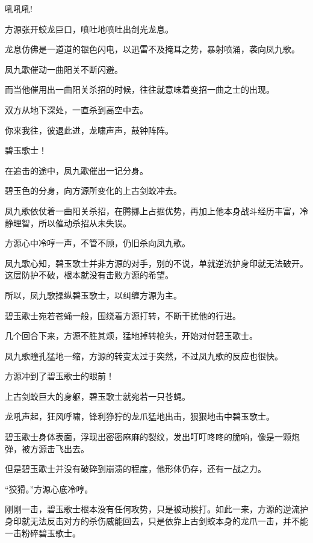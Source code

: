 
\begin{this_body}



吼吼吼!

方源张开蛟龙巨口，喷吐地喷吐出剑光龙息。

龙息仿佛是一道道的银色闪电，以迅雷不及掩耳之势，暴射喷涌，袭向凤九歌。

凤九歌催动一曲阳关不断闪避。

而当他催用出一曲阳关杀招的时候，往往就意味着变招一曲之士的出现。

双方从地下深处，一直杀到高空中去。

你来我往，彼退此进，龙啸声声，鼓钟阵阵。

碧玉歌士！

在追击的途中，凤九歌催出一记分身。

碧玉色的分身，向方源所变化的上古剑蛟冲去。

凤九歌依仗着一曲阳关杀招，在腾挪上占据优势，再加上他本身战斗经历丰富，冷静理智，所以催动杀招从未失误。

方源心中冷哼一声，不管不顾，仍旧杀向凤九歌。

凤九歌心知，碧玉歌士并非方源的对手，别的不说，单就逆流护身印就无法破开。这层防护不破，根本就没有击败方源的希望。

所以，凤九歌操纵碧玉歌士，以纠缠方源为主。

碧玉歌士宛若苍蝇一般，围绕着方源打转，不断干扰他的行进。

几个回合下来，方源不胜其烦，猛地掉转枪头，开始对付碧玉歌士。

凤九歌瞳孔猛地一缩，方源的转变太过于突然，不过凤九歌的反应也很快。

方源冲到了碧玉歌士的眼前！

上古剑蛟巨大的身躯，碧玉歌士就宛若一只苍蝇。

龙吼声起，狂风呼啸，锋利狰狞的龙爪猛地出击，狠狠地击中碧玉歌士。

碧玉歌士身体表面，浮现出密密麻麻的裂纹，发出叮叮咚咚的脆响，像是一颗炮弹，被方源击飞出去。

但是碧玉歌士并没有破碎到崩溃的程度，他形体仍存，还有一战之力。

“狡猾。”方源心底冷哼。

刚刚一击，碧玉歌士根本没有任何攻势，只是被动挨打。如此一来，方源的逆流护身印就无法反击对方的杀伤威能回去，只是依靠上古剑蛟本身的龙爪一击，并不能一击粉碎碧玉歌士。


\end{this_body}

